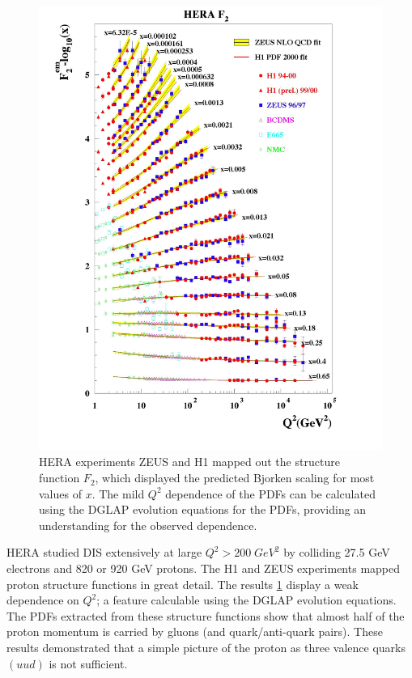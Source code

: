 \begin{figure}
	\centering
	\includegraphics[width = \textwidth]{image/plots/introduction/f2.jpg}	
	\caption[$F_{2} (Q^2)$ results from HERA]{HERA experiments ZEUS and H1 mapped out the structure function $F_2$, which displayed the predicted Bjorken scaling for most values of $x$.   The mild $Q^2$ dependence of the PDFs can be calculated using the DGLAP evolution equations for the PDFs, providing an understanding for the observed dependence.}
	\label{fig:f2}
\end{figure}

HERA studied DIS extensively at large $Q^2 > 200 \; GeV^2$ by colliding 27.5 GeV electrons and 820 or 920 GeV protons.  The H1 and ZEUS experiments mapped proton structure functions in great detail.  The results \ref{fig:f2} display a weak dependence on $Q^2$; a feature calculable using the DGLAP evolution equations.  The PDFs extracted from these structure functions show that almost half of the proton momentum is carried by gluons (and quark/anti-quark pairs).  These results demonstrated that a simple picture of the proton as three valence quarks $(uud)$ is not sufficient.    

